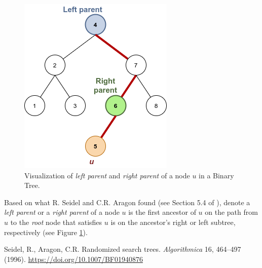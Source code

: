 \documentclass[12pt,english,]{article}
\begin{document}
\begin{figure}
\centering
\begin{minipage}{0.35\textwidth}
\vspace{1mm}
\includegraphics[width=\textwidth]{Tree.png}
\caption{\label{fig1:figs}Visualization of \textit{left parent} and \textit{right parent} of a node $u$ in a Binary Tree.}
\end{minipage}
\end{figure}

Based on what R. Seidel and C.R. Aragon found (see Section 5.4 of
\cite{1}), denote a \emph{left parent} or a \emph{right parent} of a
node \(u\) is the first ancestor of \(u\) on the path from \(u\) to the
\emph{root} node that satisfies \(u\) is on the ancestor's right or left
subtree, respectively (see Figure \ref{fig1:figs}).

\newpage
\begin{thebibliography}{9}
Seidel, R., Aragon, C.R. Randomized search trees. \emph{Algorithmica} 16, 464–497 (1996). \url{https://doi.org/10.1007/BF01940876}

\end{thebibliography}
\end{document}
